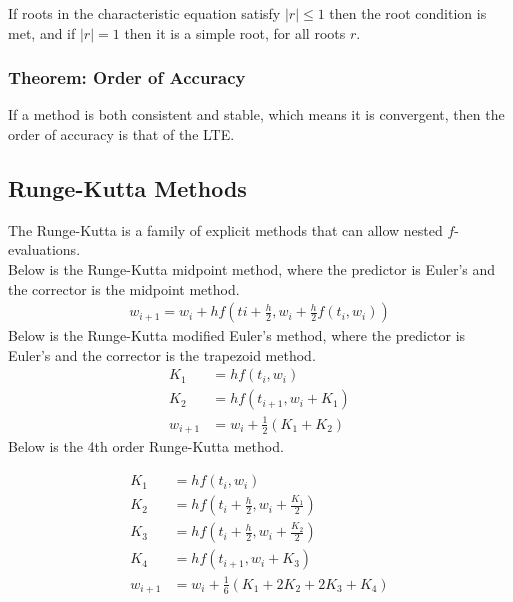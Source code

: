 \documentclass[12pt, letterpaper]{article}
\begin{document}
\noindent If roots in the characteristic equation satisfy $|r|\le 1$ then the root condition is met, and if $|r| = 1$ then it is a simple root, for all roots $r$.

\subsubsection{Theorem: Order of Accuracy}
If a method is both consistent and stable, which means it is convergent, then the order of accuracy is that of the LTE.

\subsection{Runge-Kutta Methods}
The Runge-Kutta is a family of explicit methods that can allow nested $f$-evaluations. \\

\noindent Below is the Runge-Kutta midpoint method, where the predictor is Euler's and the corrector is the midpoint method.
\begin{align*}
    w_{i+1} = w_i +hf(ti+\frac{h}{2}, w_i + \frac{h}{2}f(t_i,w_i))
\end{align*}
Below is the Runge-Kutta modified Euler's method, where the predictor is Euler's and the corrector is the trapezoid method.
\begin{align*}
    K_1 &= hf(t_i,w_i) \\
    K_2 &= hf(t_{i+1}, w_i + K_1) \\
    w_{i+1} &= w_i + \frac 12 (K_1 + K_2)
\end{align*}
Below is the 4th order Runge-Kutta method.

\begin{align*}
    K_1 &= hf(t_i,w_i) \\
    K_2 &= hf(t_i+\frac h2, w_i+ \frac{K_1}{2}) \\ 
    K_3 &= hf(t_i+\frac h2, w_i+ \frac{K_2}{2}) \\ 
    K_4 &= hf(t_{i+1},w_i+K_3) \\ 
    w_{i+1} &= w_i + \frac 16 (K_1 + 2K_2 + 2K_3 + K_4)
\end{align*}
\end{document}
